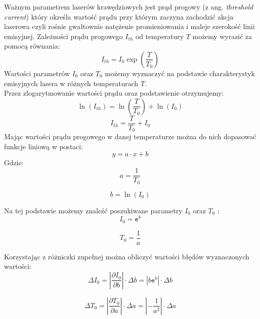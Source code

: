 \documentclass[a4paper, portrait,12pt]{report}
\begin{document}
Ważnym parametrem laserów krawędziowych jest prąd progowy (z ang. \textit{threshold
current}) który określa wartość prądu przy którym zaczyna zachodzić akcja laserowa czyli
rośnie gwałtownie natężenie promieniowania i maleje szerokość linii emisyjnej.
Zależności prądu progowego $I_{th}$ od temperatury $T$ możemy wyrazić za pomocą równania:
\begin{equation}
I_{th} = I_0 \exp \left( \frac{T}{T_0} \right)
\end{equation}
Wartości parametrów $I_0$ oraz $T_0$ możemy wyznaczyć na podstawie charakterystyk
emisyjnych lasera w różnych temperaturach $T$. \\
Przez zlogarytmowanie wartości prądu oraz podstawienie otrzymujemy:
\begin{equation}
\ln(I_{th}) =   \ln \left(\frac{T}{T_0} \right) + \ln(I_0)
\end{equation}
\begin{equation}
I_{th} = \frac{T}{T_0} + I_0
\end{equation}
Mając wartości prądu progowego w danej temperaturze  można do nich dopasować funkcje liniową w postaci:
\begin{equation}
y = a \cdot x + b
\end{equation}
Gdzie:
\begin{equation}
a = \frac{1}{T_0}
\end{equation}

\begin{equation}
b = \ln(I_0)
\end{equation}

Na tej podstawie możemy znaleźć poszukiwane parametry $I_0$ oraz $T_0$ :
\begin{equation}
I_0 = \mathtt{e}^b
\end{equation}

\begin{equation}
T_0 = \frac{1}{a}
\end{equation}

Korzystając z różniczki zupełnej można obliczyć wartości błędów wyznaczonych wartości:
\begin{equation}
\Delta I_0 = \left\lvert \frac{\partial I_{0}}{\partial b} \right\rvert \cdot \Delta b = | b \mathtt{e}^b | \cdot \Delta b
\end{equation}

\begin{equation}
\Delta T_0 = \left\lvert \frac{\partial T_{0}}{\partial a} \right\rvert \cdot \Delta a = \left\lvert -\frac{1}{a^2} \right\rvert \cdot \Delta a
\end{equation}
\end{document}
